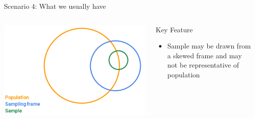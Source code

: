 \documentclass[aspectratio=169]{../latex_main/tntbeamer}  %
\begin{document}
	
		\begin{frame}{Scenario 4: What we usually have}
	    \begin{columns}
	        \begin{column}{.4\textwidth}

	               \includegraphics[scale=.35]{Bild6}

	        \end{column}
	        
	        \begin{column}{.4\textwidth}
	            Key Feature
                \begin{itemize}
                    \item Sample may be drawn from a skewed frame and may not be representative of population
                \end{itemize}
	        \end{column}
	        
	    \end{columns}
	    
	\end{frame}
	
\end{document}
